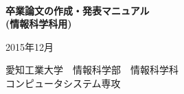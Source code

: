 \begin{titlepage}

\ \\
\begin{center}

\vspace{4.0cm}
{\Huge 
\baselineskip=15mm
\textbf{卒業論文の作成・発表マニュアル\\
(情報科学科用)\\}}

\vspace{10.0cm}

{\LARGE
\baselineskip=10mm
2015年12月\\

\vspace{1.0cm}


愛知工業大学\ \ 情報科学部\ \ 情報科学科\\
コンピュータシステム専攻\\}

\end{center}

\end{titlepage}
